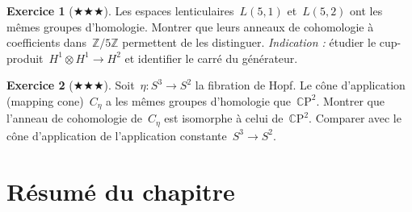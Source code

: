 \documentclass[12pt,a4paper,openany]{book}
\theoremstyle{definition}
\newtheorem{exercice}{Exercice}[chapter]
\theoremstyle{plain}
\theoremstyle{remark}
\newcommand{\Z}{\mathbb{Z}}
\newcommand{\CP}{\mathbb{C}\mathrm{P}}
\begin{document}
\begin{exercice}[$\bigstar\bigstar\bigstar$]\label{exo:distinction-lens}
Les espaces lenticulaires~$L(5,1)$ et~$L(5,2)$ ont les mêmes groupes d'homologie.
Montrer que leurs anneaux de cohomologie à coefficients dans~$\Z/5\Z$ permettent
de les distinguer.
\emph{Indication :} étudier le cup-produit~$H^1 \otimes H^1 \to H^2$ et identifier
le carré du générateur.
\end{exercice}

\begin{exercice}[$\bigstar\bigstar\bigstar$]\label{exo:hopf}
Soit~$\eta \colon S^3 \to S^2$ la fibration de Hopf. Le cône
d'application (mapping cone)~$C_\eta$ a les mêmes groupes d'homologie que~$\CP^2$.
Montrer que l'anneau de cohomologie de~$C_\eta$ est isomorphe à celui de~$\CP^2$.
Comparer avec le cône d'application de l'application constante~$S^3 \to S^2$.
\end{exercice}

\section*{Résumé du chapitre}
\end{document}
